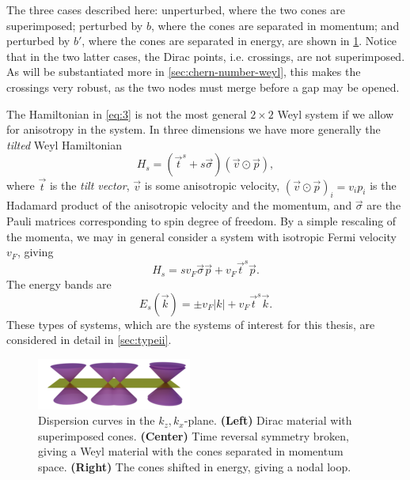 The three cases described here: unperturbed, where the two cones are superimposed; perturbed by $b$, where the cones are separated in momentum; and perturbed by $b'$, where the cones are separated in energy, are shown in \cref{fig:conetypes}.
Notice that in the two latter cases, the Dirac points, i.e. crossings, are not superimposed.
As will be substantiated more in \cref{sec:chern-number-weyl}, this makes the crossings very robust, as the two nodes must merge before a gap may be opened.


The Hamiltonian in \cref{eq:3} is not the most general \( 2 \times 2 \) Weyl system if we allow for anisotropy in the system.
In three dimensions we have more generally the \emph{tilted} Weyl Hamiltonian
\begin{equation}
  \label{eq:4}
  H_s = (\vec{t}^{s} + s \vec{\sigma}) (\vec{v} \odot \vec{p}),
\end{equation}
where $\vec{t}$ is  the \emph{tilt vector}, $\vec{v}$ is some anisotropic velocity, $(\vec{v} \odot \vec{p})_i = v_i p_i$ is the Hadamard product of the anisotropic velocity and the momentum,  and $\vec{\sigma}$ are the Pauli matrices corresponding to spin degree of freedom.
By a simple rescaling of the momenta, we may in general consider a system with isotropic Fermi velocity \( v_F \), giving
\begin{equation}
  \label{eq:hamil-tilt-isotropic}
  H_s = s v_F \vec{\sigma} \vec{p} + v_F \vec{t}^s \vec{p}.
\end{equation}
The energy bands are
\begin{equation}
  \label{eq:tilted-eigenvalue}
  E_s(\vec{k}) = \pm v_F |k| + v_F \vec{t}^{s} \vec{k}.
\end{equation}
These types of systems, which are the systems of interest for this thesis, are considered in detail in \cref{sec:typeii}.

\begin{figure}[p!]
  \centering
  \includegraphics[width=\textwidth]{figures/cones-types-col1-opaque-small.png}
  \caption{Dispersion curves in the $k_z, k_x$-plane. \textbf{(Left)} Dirac material with superimposed cones. \textbf{(Center)} Time reversal symmetry broken, giving a Weyl material with the cones separated in momentum  space. \textbf{(Right)} The cones shifted in energy, giving a nodal loop.
  }
  \label{fig:conetypes}
\end{figure}

